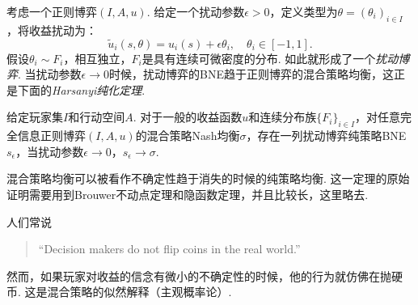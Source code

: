 考虑一个正则博弈$(I,A,u)$. 给定一个扰动参数$\epsilon>0$，定义类型为$\theta=(\theta_i)_{i\in I}$，将收益扰动为：
\[\tilde u_i(s,\theta)=u_i(s)+\epsilon\theta_i,\quad\theta_i\in[-1,1].\]
假设$\theta_i\sim F_i$，相互独立，$F_i$是具有连续可微密度的分布. 如此就形成了一个\emph{扰动博弈}. 当扰动参数$\epsilon\to 0$时候，扰动博弈的BNE趋于正则博弈的混合策略均衡，这正是下面的\emph{Harsanyi纯化定理}. 

\begin{theorem}[Harsanyi纯化定理]\label{thm:har}
给定玩家集$I$和行动空间$A$. 对于一般的收益函数$u$和连续分布族$\{F_i\}_{i\in I}$，对任意完全信息正则博弈$(I,A,u)$的混合策略Nash均衡$\sigma$，存在一列扰动博弈纯策略BNE $s_\epsilon$，当扰动参数$\epsilon\to 0$，$s_\epsilon\to \sigma$.
\end{theorem}
混合策略均衡可以被看作不确定性趋于消失的时候的纯策略均衡. 这一定理的原始证明需要用到Brouwer不动点定理和隐函数定理，并且比较长，这里略去.

人们常说
\begin{quotation}
``Decision makers do not flip coins in the real world.''
\end{quotation}

然而，如果玩家对收益的信念有微小的不确定性的时候，他的行为就仿佛在抛硬币. 这是混合策略的似然解释（主观概率论）.

